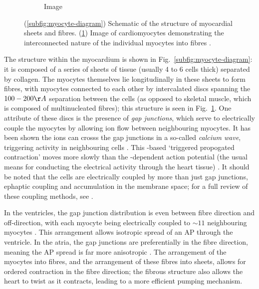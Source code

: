 \documentclass[../thesis-main.tex]{subfiles}
\begin{document}
\begin{figure}
\begin{subfigure}[b]{0.45\textwidth}
  \caption{Image}
  \label{subfig:myocyte-image}
 \end{subfigure}
 \caption[Structure of myocardial sheets and fibres]{(\ref{subfig:myocyte-diagram}) Schematic of the structure of myocardial sheets and fibres. (\ref{subfig:myocyte-image}) Image of cardiomyocytes demonstrating the interconnected nature of the individual myocytes into fibres \citep{Girod2006}.}
 \label{fig:myocyte-structure}
\end{figure}

The structure within the myocardium is shown in Fig.~\ref{subfig:myocyte-diagram}: it is composed of a series of sheets of tissue (usually 4 to 6 cells thick) separated by collagen. The myocytes themselves lie longitudinally in these sheets to form fibres, with myocytes connected to each other by intercalated discs spanning the $100-200\AA$ separation between the cells (as opposed to skeletal muscle, which is composed of multinucleated fibres); this structure is seen in Fig.~\ref{subfig:myocyte-image}. One attribute of these discs is the presence of \emph{gap junctions}, which serve to electrically couple the myocytes by allowing ion flow between neighbouring myocytes. It has been shown the \ca{} ions can crosss the gap junctions in a so-called \emph{calcium wave}, triggering activity in neighbouring cells \citep{Miura1998}. This \ca{}-based `triggered propogated contraction' moves more slowly than the \na{}-dependent action potential (the usual means for conducting the electrical activity through the heart tissue) \citep{Clusin2003}. It should be noted that the cells are electrically coupled by more than just gap junctions, \eg{} ephaptic coupling and \K{} accumulation in the membrane space; for a full review of these coupling methods, see \citet{Sperelakis2002}.

In the ventricles, the gap junction distribution is even between fibre direction and off-direction, with each myocyte being electrically coupled to $\sim11$ neighbouring myocytes \citep{Smaill2013}. This arrangement allows isotropic spread of an AP through the ventricle. In the atria, the gap junctions are preferentially in the fibre direction, meaning the AP spread is far more anisotropic \citep{Saffitz1994}. The arrangement of the myocytes into fibres, and the arrangement of these fibres into sheets, allows for ordered contraction in the fibre direction; the fibrous structure also allows the heart to twist as it contracts, leading to a more efficient pumping mechanism.
\end{document}
